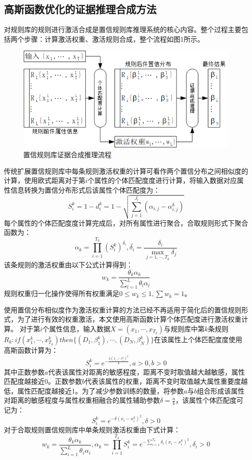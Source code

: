 \documentclass{cjc}
\begin{document}
\subsection{高斯函数优化的证据推理合成方法}
对规则库的规则进行激活合成是置信规则库推理系统的核心内容。整个过程主要包括两个步骤：计算激活权重、激活规则合成，整个流程如图1所示。
\begin{figure}
	\includegraphics[width=\linewidth]{1brb.png}
	\caption{置信规则库证据合成推理流程}
\end{figure}

传统扩展置信规则库中每条规则激活权重的计算可看作两个置信分布之间相似度的计算，使用欧式距离对于第$i$个属性的个体匹配度度进行计算，将输入数据对应属性信息转换为置信分布形式后该属性个体匹配度为：
$$S_i^k=1-d_i^k=1-\sqrt{\sum_{j=1}^{J_i}(\alpha_{i,j}-\alpha_{i,j}^k)}$$
每个属性的个体匹配度度计算完成后，对所有属性进行聚合，合取规则形式下聚合函数为：
$$\alpha_k=\prod_{i=1}^{T_k}(S_i^k)^{\overline{\delta_i}},\overline{\delta_i}=\frac{\delta_i}{\max_{j=1,\cdots,T_k}\delta_j}$$
该条规则的激活权重由以下公式计算得到：
$$w_k=\frac{\theta_k\alpha_k}{\sum_{l=1}^L\theta_l\alpha_l}$$
规则权重归一化操作使得所有权重满足$0\leq w_k\leq 1,\sum w_k=1$。

使用置信分布相似度作为激活权重计算的方法已经不再适用于简化后的置信规则形式，为了进行有效的权重激活，本文使用高斯函数计算个体匹配度进行激活权重计算。
对于第$i$个属性信息，输入数据$X=(x_1,\cdots,x_{T_k})$与规则库中第$k$条规则$R_k:if(x_1^k , \cdots , x_{T_k}^k)then\{(D_1,\beta_1^k),\cdots,(D_N,\beta_N^k)\}$在该属性上个体匹配度度使用高斯函数计算为：
$$S_i^k=e^{-\frac{a(x_i-x_i^k)^2}{b}},a>0,b>0$$
其中正数参数$a$代表该属性对距离的敏感程度，距离不变时取值越大越敏感，属性匹配度越接近0。正数参数$b$代表该属性的权重，距离不变时取值越大属性重要度越低，属性匹配度越接近1。为了减少参数训练的数量，将参数$a$与$b$组合形成该属性对距离的敏感程度与属性权重相融合的属性辅助参数$\delta=\frac{a}{b}$，该属性个体匹配度可记为：
$$S_i^k=e^{-\delta(x_i-x_i^k)^2},\delta>0$$
对于合取规则置信规则库中单条规则激活权重由下式计算：
$$w_k=\frac{\theta_k\alpha_k}{\sum_{i=1}^L\theta_i\alpha_i},\alpha_k=\prod_{i=1}^{T_k}S_i^k=e^{-\sum_{i=1}^{T_k}\delta_i(x_i-x_i^k)^2},\delta_i>0$$
\end{document}
